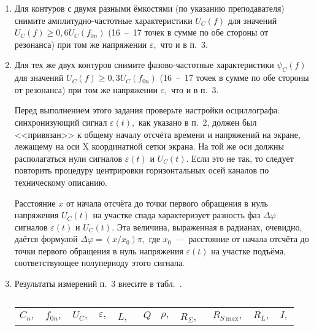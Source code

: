 \begin{lab:task}
\begin{enumerate}
    \item Для контуров с двумя разными ёмкостями (по указанию преподавателя) снимите амплитудно-частотные характеристики $U_C(f)$ для значений $U_C(f)\ge0,6U_C(f_{0n})$ (16~--~17 точек в сумме по обе стороны от резонанса) при том же напряжении $\varepsilon,$ что и в п.~3.

    \item Для тех же двух контуров снимите фазово-частотные характеристики $\psi_C(f)$ для значений $U_C(f)\ge0,3U_C(f_{0n})$ (16~--~17 точек в сумме по обе стороны от резонанса) при том же напряжении $\varepsilon,$ что и в п.~3.

		    Перед выполнением этого задания проверьте настройки осциллографа: синхронизующий сигнал $\varepsilon(t),$ как указано в п.~2, должен был <<привязан>> к общему началу отсчёта времени и напряжений на экране, лежащему на оси X координатной сетки экрана. На той же оси должны располагаться нули сигналов $\varepsilon(t)$ и $U_C(t).$ Если это не так, то следует повторить процедуру центрировки горизонтальных осей каналов по техническому описанию.

		    Расстояние $x$ от начала отсчёта до точки первого обращения в нуль напряжения $U_C(t)$ на участке спада характеризует разность фаз $\Delta\varphi$ сигналов $\varepsilon(t)$ и $U_C(t).$ Эта величина, выраженная в радианах, очевидно, даётся формулой $\Delta\varphi=(x/x_0)\pi,$ где $x_0$~---~расстояние от начала отсчёта до точки первого обращения в нуль напряжения $\varepsilon(t)$ на участке подъёма, соответствующее полупериоду этого сигнала.


		    \item Результаты измерений п.~3 внесите в табл.~.
		    \begin{center}
		        \begin{table}[tb!]
		            \caption{}
		            \begin{center}
		                \begin{tabular}{|c|c|c|c|c|c|c|c|c|c|c|}
		                    \hline
		                    $C_n,$ & $f_{0n},$& $U_C,$& $\varepsilon,$ & $L,$~& $Q$& $\rho,$ & $R_{\Sigma},$~& $R_{S~\text{max}},$& $R_L,$& $I,$\\


\end{tabular}
\end{center}
\end{table}
\end{center}
\end{enumerate}
\end{lab:task}
